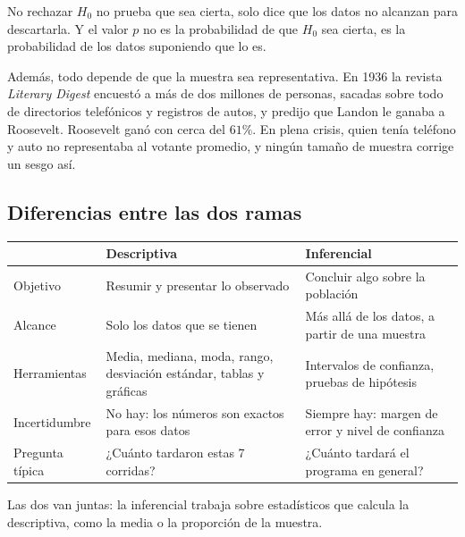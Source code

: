 \documentclass[11pt,letterpaper]{article}
\begin{document}
\begin{ojo}
    No rechazar $H_0$ no prueba que sea cierta, solo dice que los
    datos no alcanzan para descartarla. Y el valor $p$ no es la
    probabilidad de que $H_0$ sea cierta, es la probabilidad de los
    datos suponiendo que lo es.

    Además, todo depende de que la muestra sea representativa. En
    1936 la revista \textit{Literary Digest} encuestó a más de dos
    millones de personas, sacadas sobre todo de directorios telefónicos
    y registros de autos, y predijo que Landon le ganaba a Roosevelt.
    Roosevelt ganó con cerca del $61\%$. En plena crisis, quien tenía
    teléfono y auto no representaba al votante promedio, y ningún
    tamaño de muestra corrige un sesgo así.
\end{ojo}


\subsection*{Diferencias entre las dos ramas}

\begin{center}
\begin{tabular}{p{2.6cm}p{5.4cm}p{5.4cm}}
    \toprule
    & \textbf{Descriptiva} & \textbf{Inferencial} \\
    \midrule
    Objetivo & Resumir y presentar lo observado
             & Concluir algo sobre la población \\
    \addlinespace
    Alcance  & Solo los datos que se tienen
             & Más allá de los datos, a partir de una muestra \\
    \addlinespace
    Herramientas & Media, mediana, moda, rango, desviación estándar,
                   tablas y gráficas
                 & Intervalos de confianza, pruebas de hipótesis \\
    \addlinespace
    Incertidumbre & No hay: los números son exactos para esos datos
                  & Siempre hay: margen de error y nivel de confianza \\
    \addlinespace
    Pregunta típica & ¿Cuánto tardaron estas 7 corridas?
                    & ¿Cuánto tardará el programa en general? \\
    \bottomrule
\end{tabular}
\end{center}

Las dos van juntas: la inferencial trabaja sobre estadísticos que
calcula la descriptiva, como la media o la proporción de la muestra.
\end{document}

